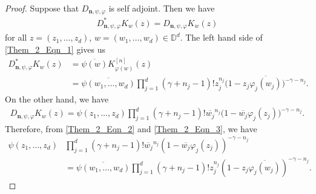 \documentclass[12pt, reqno]{amsart}
\theoremstyle{definition}
\theoremstyle{remark}
\numberwithin{equation}{section}
\newcommand{\mfn}{\mathbf n}
\begin{document}
 \begin{proof}
  	Suppose that $D_{\mfn,\psi,\varphi}$ is self adjoint. Then we have
 	\begin{align}\label{Them_2_Eqn_1}
 	D_{\mfn,\psi, \varphi}^*K_w(z)= D_{\mfn,\psi, \varphi}K_w(z)
 	\end{align}
 	for all $z=(z_1, \dots, z_d)$, $w=(w_1, \dots, w_d)\in \mathbb{D}^d$.
 	The left hand side of \eqref{Them_2_Eqn_1} gives us 
 	\begin{align}\label{Them_2_Eqn_2}
 	D_{\mfn,\psi, \varphi}^*K_w(z)&=\overline{\psi(w)}K_{\varphi(w)}^{[n]}(z)\nonumber\\
 	&=\overline{\psi(w_1, \dots, w_d)}\prod_{j=1}^d(\gamma+n_j-1)!z_j^{n_j}\Big(1-z_j\overline{\varphi_j(w_j)}\Big)^{-\gamma-n_j}.
 	\end{align}
 	On the other hand, we have 
 	\begin{align}\label{Them_2_Eqn_3}
 	 D_{\mfn,\psi, \varphi}K_w(z)=\psi(z_1, \dots, z_d)\prod_{j=1}^d(\gamma+n_j-1)!\overline{w_j}^{n_j}\Big(1-\overline{w_j}\varphi_j(z_j)\Big)^{-\gamma-n_j}.
 	\end{align}
 Therefore, from \eqref{Them_2_Eqn_2} and \eqref{Them_2_Eqn_3}, we have 
 	\begin{align}\label{Them_2_Eqn_4}
 	\psi(z_1, \dots, z_d)&\prod_{j=1}^d(\gamma+n_j-1)!\overline{w_j}^{n_j}(1-\overline{w_j}\varphi_j(z_j))^{-\gamma-n_j}\nonumber\\
 	&=\overline{\psi(w_1, \dots, w_d)}\prod_{j=1}^d(\gamma+n_j-1)!z_j^{n_j}(1-z_j\overline{\varphi_j(w_j)})^{-\gamma-n_j}.
 	\end{align}
 

\end{proof}
\end{document}
